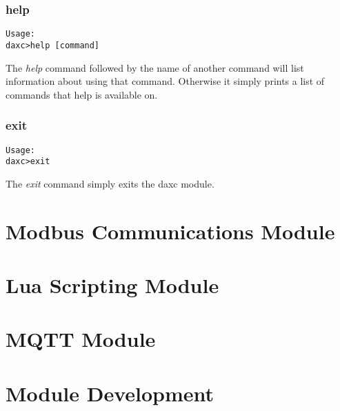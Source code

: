 \subsection{help}
\begin{verbatim}
Usage:
daxc>help [command]
\end{verbatim}

The \textit{help} command followed by the name of another command will list information about using that command. Otherwise it simply prints a list of commands that help is available on.

\subsection{exit}
\begin{verbatim}
Usage:
daxc>exit
\end{verbatim}
The \textit{exit} command simply exits the daxc module.

\chapter{Modbus Communications Module}

\chapter{Lua Scripting Module}

\chapter{MQTT Module}


\chapter{Module Development}


